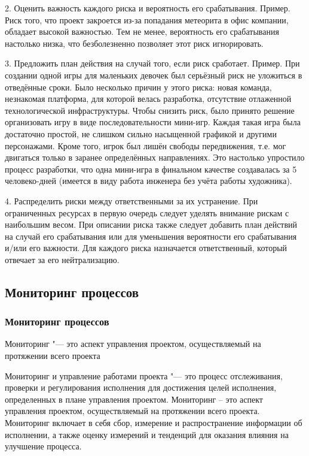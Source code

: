 \documentclass{../industrial-development}
\begin{document}
2. Оценить важность каждого риска и вероятность его срабатывания.
Пример. Риск того, что проект закроется из-за попадания метеорита в офис компании, обладает высокой важностью. Тем не менее, вероятность его срабатывания настолько низка, что безболезненно позволяет этот риск игнорировать.

3. Предложить план действия на случай того, если риск сработает.
Пример. При создании одной игры для маленьких девочек был серьёзный риск не уложиться в отведённые сроки. Было несколько причин у этого риска: новая команда, незнакомая платформа, для которой велась разработка, отсутствие отлаженной технологической инфраструктуры. Чтобы снизить риск, было принято решение организовать игру в виде последовательности мини-игр. Каждая такая игра была достаточно простой, не слишком сильно насыщенной графикой и другими персонажами. Кроме того, игрок был лишён свободы передвижения, т.е. мог двигаться только в заранее определённых направлениях. Это настолько упростило процесс разработки, что одна мини-игра в финальном качестве создавалась за 5 человеко-дней (имеется в виду работа инженера без учёта работы художника).

4. Распределить риски между ответственными за их устранение.
При ограниченных ресурсах в первую очередь следует уделять внимание рискам с наибольшим весом.
При описании риска также следует добавить план действий на случай его срабатывания или для уменьшения вероятности его срабатывания и/или его важности. Для каждого риска назначается ответственный, который отвечает за его нейтрализацию.

    \subsection{Мониторинг процессов}

\begin{frame} \frametitle{Мониторинг процессов}
	\begin{definition}
		\alert{Мониторинг} "--- это аспект управления проектом, осуществляемый на протяжении всего проекта
	\end{definition}
\end{frame}
\lecturenotes

Мониторинг и управление работами проекта "--- это процесс отслеживания, проверки и регулирования исполнения для достижения целей исполнения, определенных в плане управления проектом. Мониторинг – это аспект управления проектом, осуществляемый на протяжении всего проекта. Мониторинг включает в себя сбор, измерение и распространение информации об исполнении, а также оценку измерений и тенденций для оказания влияния на улучшение процесса.
\end{document}
